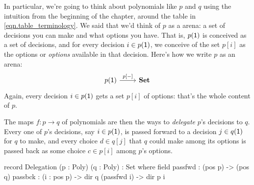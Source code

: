 \documentclass[Book-Poly]{subfiles}
\begin{document}
In particular, we're going to think about polynomials like $p$ and $q$ using the
intuition from the beginning of the chapter, around the table in
\eqref{eqn.table_terminology}. We said that we'd think of $p$ as a arena: a set
of decisions you can make and what options you have. That is, $p(\textsf{1})$ is
conceived as a set of decisions, and for every decision $i\in p(\textsf{1})$, we
conceive of the set $p[i]$ as the options or \emph{options} available in that
decision. Here's how we write $p$ as an arena:
\[
\begin{tikzcd}
p(\1)\ar[r, "{p[-]}"]&\smset
\end{tikzcd}
\]
Again, every decision $i\in p(\textsf{1})$ gets a set $p[i]$ of options: that's the whole
content of $p$.
%

The maps $f\colon p\to q$ of polynomials are then the ways to \emph{delegate} $p$'s decisions to $q$. Every one of $p$'s decisions, say $i\in p(\textsf{1})$, is passed forward to a decision $j\in q(\textsf{1})$ for $q$ to make, and every choice $d\in q[j]$ that $q$ could make among its options is passed back as some choice $c\in p[i]$ among $p$'s options.

\begin{agda}
record Delegation (p : Poly) (q : Poly) : Set where
   field 
     passfwd : (pos p) -> (pos q)
     passbck : (i : pos p) -> dir q (passfwd i) -> dir p i
\end{agda}
\end{document}
